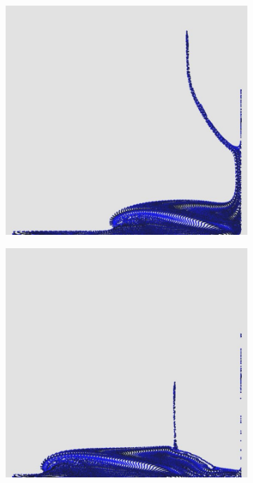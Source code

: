 \documentclass[12pt,a4paper,dvipsnames]{article}
\begin{document}
\begin{figure}[!ht]
\begin{subfigure}[!h]{0.3\textwidth}
	\end{subfigure}
	\begin{subfigure}[!h]{0.3\textwidth} \centering
		\includegraphics[width=\textwidth]{VDB/VDB-09.jpg}
	\end{subfigure}
	\begin{subfigure}[!h]{0.3\textwidth} \centering
		\includegraphics[width=\textwidth]{VDB/VDB-10.jpg}

\end{subfigure}
\end{figure}
\end{document}
